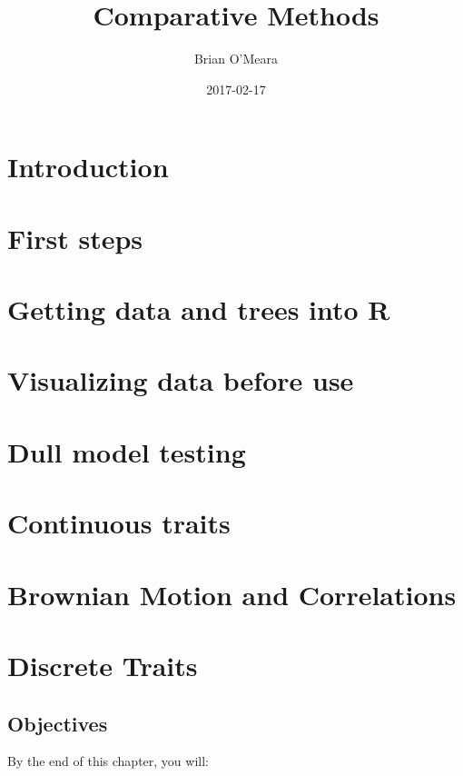 \documentclass[]{book}
\title{Comparative Methods}
\author{Brian O'Meara}
\date{2017-02-17}
\theoremstyle{definition}
\theoremstyle{definition}
\theoremstyle{remark}
\begin{document}
\maketitle

{
\setcounter{tocdepth}{1}
\tableofcontents
}
\chapter{Introduction}\label{introduction}

\chapter{First steps}\label{first-steps}

\chapter{Getting data and trees into
R}\label{getting-data-and-trees-into-r}

\chapter{Visualizing data before use}\label{visualizing-data-before-use}

\chapter{Dull model testing}\label{dull-model-testing}

\chapter{Continuous traits}\label{continuous-traits}

\chapter{Brownian Motion and
Correlations}\label{brownian-motion-and-correlations}

\chapter{Discrete Traits}\label{discrete-traits}

\section{Objectives}\label{objectives}

By the end of this chapter, you will:
\end{document}
